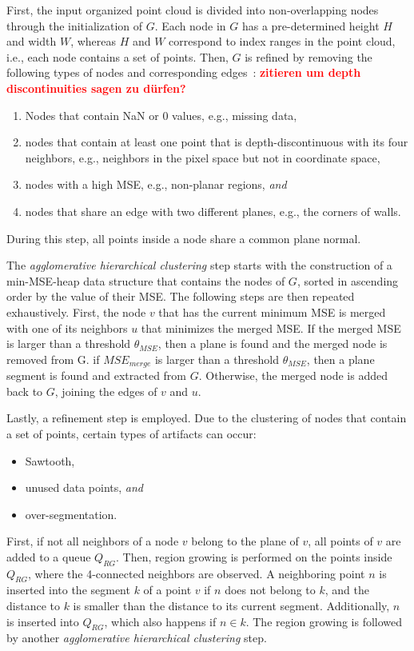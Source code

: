 \documentclass[main.tex]{subfiles}
\begin{document}
First, the input organized point cloud is divided into non-overlapping nodes through the initialization of $G$.
Each node in $G$ has a pre-determined height $H$ and width $W$, whereas $H$ and $W$ correspond to index ranges in the
point cloud, i.e., each node contains a set of points.
Then, $G$ is refined by removing the following types of nodes and corresponding edges~\cite[Section~III.A]{Feng_Taguchi_Kamat_2014}:
\textbf{\textcolor{red}{zitieren um depth discontinuities sagen zu dürfen?}}
\begin{enumerate}
    \item Nodes that contain NaN or 0 values, e.g., missing data,
    \item nodes that contain at least one point that is depth-discontinuous with its four neighbors, e.g., neighbors
          in the pixel space but not in coordinate space,
    \item nodes with a high MSE, e.g., non-planar regions, \textit{and}
    \item nodes that share an edge with two different planes, e.g., the corners of walls.
\end{enumerate}
During this step, all points inside a node share a common plane normal.

The \textit{agglomerative hierarchical clustering} step starts with the construction of a min-MSE-heap data
structure that contains the nodes of $G$, sorted in ascending order by the value of their MSE.
The following steps are then repeated exhaustively.
First, the node $v$ that has the current minimum MSE is merged with one of its neighbors $u$ that minimizes the merged MSE.
If the merged MSE is larger than a threshold $\theta_{MSE}$, then a plane is found and the merged node is removed from G.
if $MSE_{merge}$ is larger than a threshold $\theta_{MSE}$, then a plane segment is found and extracted from $G$.
Otherwise, the merged node is added back to $G$, joining the edges of $v$ and $u$.

Lastly, a refinement step is employed. Due to the clustering of nodes that contain a set of points, certain types of
artifacts can occur:
\begin{itemize}
    \item Sawtooth,
    \item unused data points, \textit{and}
    \item over-segmentation.
\end{itemize}
First, if not all neighbors of a node $v$ belong to the plane of $v$, all points of $v$ are added to a queue $Q_{RG}$.
Then, region growing is performed on the points inside $Q_{RG}$, where the 4-connected neighbors are observed.
A neighboring point $n$ is inserted into the segment $k$ of a point $v$ if $n$ does not belong to $k$, and
the distance to $k$ is smaller than the distance to its current segment. Additionally, $n$ is inserted into $Q_{RG}$,
which also happens if $n \in k$.
The region growing is followed by another \textit{agglomerative hierarchical clustering} step.
\end{document}
